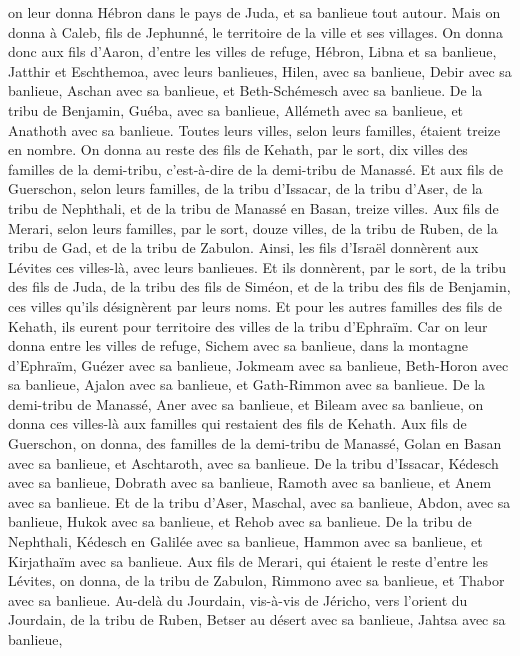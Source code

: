 \begin{multicols}{2}
on leur donna Hébron dans le pays de Juda, et sa banlieue tout autour.
Mais on donna à Caleb, fils de Jephunné, le territoire de la ville et ses villages.
On donna donc aux fils d'Aaron, d'entre les villes de refuge, Hébron, Libna et sa banlieue, Jatthir et Eschthemoa, avec leurs banlieues,
Hilen, avec sa banlieue, Debir avec sa banlieue,
Aschan avec sa banlieue, et Beth-Schémesch avec sa banlieue.
De la tribu de Benjamin, Guéba, avec sa banlieue, Allémeth avec sa banlieue, et Anathoth avec sa banlieue. Toutes leurs villes, selon leurs familles, étaient treize en nombre.
On donna au reste des fils de Kehath, par le sort, dix villes des familles de la demi-tribu, c'est-à-dire de la demi-tribu de Manassé.
Et aux fils de Guerschon, selon leurs familles, de la tribu d'Issacar, de la tribu d'Aser, de la tribu de Nephthali, et de la tribu de Manassé en Basan, treize villes.
Aux fils de Merari, selon leurs familles, par le sort, douze villes, de la tribu de Ruben, de la tribu de Gad, et de la tribu de Zabulon.
Ainsi, les fils d’Israël donnèrent aux Lévites ces villes-là, avec leurs banlieues.
Et ils donnèrent, par le sort, de la tribu des fils de Juda, de la tribu des fils de Siméon, et de la tribu des fils de Benjamin, ces villes qu’ils désignèrent par leurs noms.
Et pour les autres familles des fils de Kehath, ils eurent pour territoire des villes de la tribu d'Ephraïm.
Car on leur donna entre les villes de refuge, Sichem avec sa banlieue, dans la montagne d'Ephraïm, Guézer avec sa banlieue,
Jokmeam avec sa banlieue, Beth-Horon avec sa banlieue,
Ajalon avec sa banlieue, et Gath-Rimmon avec sa banlieue.
De la demi-tribu de Manassé, Aner avec sa banlieue, et Bileam avec sa banlieue, on donna ces villes-là aux familles qui restaient des fils de Kehath.
Aux fils de Guerschon, on donna, des familles de la demi-tribu de Manassé, Golan en Basan avec sa banlieue, et Aschtaroth, avec sa banlieue.
De la tribu d'Issacar, Kédesch avec sa banlieue, Dobrath avec sa banlieue,
Ramoth avec sa banlieue, et Anem avec sa banlieue.
Et de la tribu d'Aser, Maschal, avec sa banlieue, Abdon, avec sa banlieue,
Hukok avec sa banlieue, et Rehob avec sa banlieue.
De la tribu de Nephthali, Kédesch en Galilée avec sa banlieue, Hammon avec sa banlieue, et Kirjathaïm avec sa banlieue.
Aux fils de Merari, qui étaient le reste d'entre les Lévites, on donna, de la tribu de Zabulon, Rimmono avec sa banlieue, et Thabor avec sa banlieue.
Au-delà du Jourdain, vis-à-vis de Jéricho, vers l’orient du Jourdain, de la tribu de Ruben, Betser au désert avec sa banlieue, Jahtsa avec sa banlieue,

\end{multicols}
